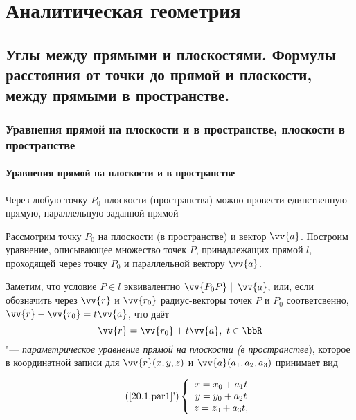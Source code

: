 \part[Аналитическая геометрия]{Аналитическая \protect\linebreak геометрия}%

\chapter{Углы между прямыми и плоскостями. Формулы расстояния от точки до прямой и плоскости, между прямыми в пространстве.}
\section{Уравнения прямой на плоскости и в пространстве, плоскости в пространстве}
\subsection{Уравнения прямой на плоскости и в пространстве}
\begin{axiome} 
  Через любую точку $P_0$ плоскости (пространства) можно провести единственную прямую, параллельную заданной прямой
\end{axiome}
  Рассмотрим точку $P_0$ на плоскости (в пространстве) и вектор $\vv{a}$. Построим уравнение, описывающее множество точек $P$, принадлежащих прямой $l$, проходящей через точку $P_0$ и параллельной вектору $\vv{a}$.

  Заметим, что условие $P \in l$ эквивалентно $ \vv{P_0P} \parallel \vv{a} $, или, если обозначить через $\vv{r}$ и $\vv{r_0}$ радиус-векторы точек $P$ и $P_0$ соответсвенно, $\vv{r}-\vv{r_0} = t\vv{a}$, что даёт
\begin{equation}\label{20.1.par1}
\vv{r}=\vv{r_0}+t\vv{a},\ t \in \bbR
\end{equation}
"--- \textit{параметрическое уравнение прямой на плоскости \textup{(}в пространстве}), которое в координатной записи для $\vv{r}(x,y,z)$ и $\vv{a}(a_1,a_2,a_3)$ принимает вид

\begin{equation}\label{20.1.par2}\tag{\ref{20.1.par1}'}
  \left\lbrace\begin{array}{crl}
  x=x_0+a_1t\\
  y=y_0+a_2t\\
  z=z_0+a_3t,\\ 
  \end{array}\right.
\end{equation}

